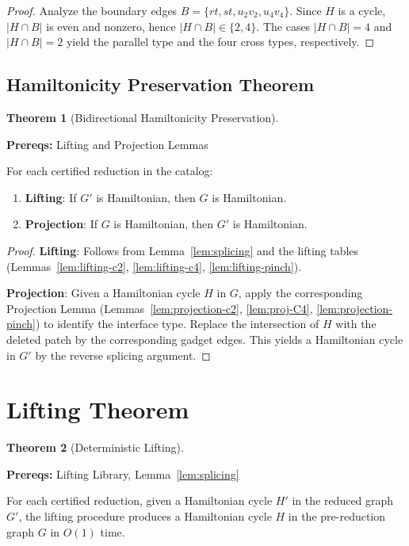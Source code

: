 \documentclass[12pt]{article}
\theoremstyle{definition}
\newtheorem{theorem}{Theorem}
\newcommand{\prereq}[1]{\par\noindent\textbf{Prereqs:} #1\par}
\begin{document}
\begin{proof}
Analyze the boundary edges $B = \{rt, st, u_2v_2, u_4v_4\}$. Since $H$ is a cycle, $|H \cap B|$ is even and nonzero, hence $|H\cap B|\in\{2,4\}$. The cases $|H\cap B|=4$ and $|H\cap B|=2$ yield the parallel type and the four cross types, respectively.
\end{proof}

\subsection{Hamiltonicity Preservation Theorem}
\label{subsec:hamiltonicity-preservation}

\begin{theorem}[Bidirectional Hamiltonicity Preservation]
\label{thm:bidirectional-hamiltonicity}
\prereq{Lifting and Projection Lemmas}
For each certified reduction in the catalog:
\begin{enumerate}
    \item \textbf{Lifting}: If $G'$ is Hamiltonian, then $G$ is Hamiltonian.
    \item \textbf{Projection}: If $G$ is Hamiltonian, then $G'$ is Hamiltonian.
\end{enumerate}
\end{theorem}

\begin{proof}
\textbf{Lifting}: Follows from Lemma~\ref{lem:splicing} and the lifting tables (Lemmas~\ref{lem:lifting-c2}, \ref{lem:lifting-c4}, \ref{lem:lifting-pinch}).

\textbf{Projection}: Given a Hamiltonian cycle $H$ in $G$, apply the corresponding Projection Lemma (Lemmas~\ref{lem:projection-c2}, \ref{lem:proj-C4}, \ref{lem:projection-pinch}) to identify the interface type. Replace the intersection of $H$ with the deleted patch by the corresponding gadget edges. This yields a Hamiltonian cycle in $G'$ by the reverse splicing argument.
\end{proof}

\section{Lifting Theorem}
\label{sec:lifting-theorem}

\begin{theorem}[Deterministic Lifting]
\label{thm:lifting}
\prereq{Lifting Library, Lemma~\ref{lem:splicing}}
For each certified reduction, given a Hamiltonian cycle $H'$ in the reduced graph $G'$,
the lifting procedure produces a Hamiltonian cycle $H$ in the pre-reduction graph $G$ in $O(1)$ time.
\end{theorem}
\end{document}

